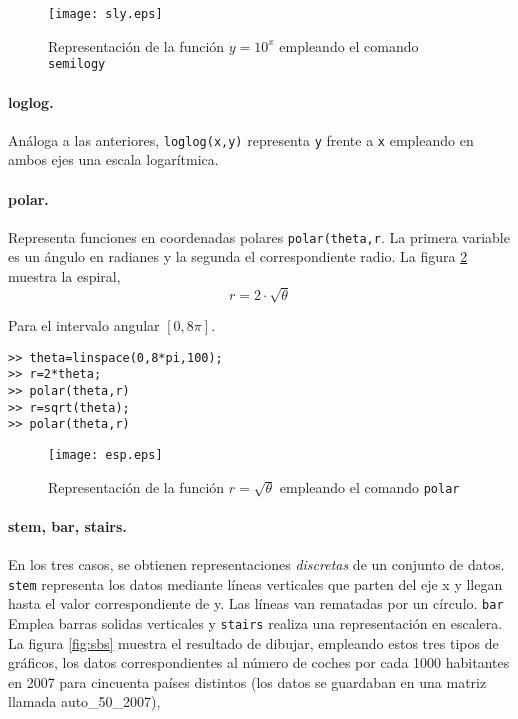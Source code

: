 \begin{figure}[h]
\centering
\texttt{[image: sly.eps]}
\caption{Representación de la función $y=10^x$ empleando el comando \texttt{semilogy}}
\label{fig:sly}
\end{figure}

\paragraph{loglog.} Análoga a las anteriores, \texttt{loglog(x,y)} representa \texttt{y} frente a \texttt{x} empleando en ambos ejes una escala logarítmica.


\paragraph{polar.} Representa funciones en coordenadas polares \texttt{polar(theta,r}. La primera variable es un ángulo en radianes y la segunda el correspondiente radio. La figura \ref{fig:esp} muestra la espiral,
\begin{equation*}
r=2\cdot\sqrt{\theta}
\end{equation*}

Para el intervalo angular $[0,8\pi]$.
 
\begin{verbatim}
>> theta=linspace(0,8*pi,100);
>> r=2*theta;
>> polar(theta,r)
>> r=sqrt(theta);
>> polar(theta,r)
\end{verbatim}

\begin{figure}[h]
\centering
\texttt{[image: esp.eps]}
\caption{Representación de la función $r=\sqrt{\theta}$ empleando el comando \texttt{polar}}
\label{fig:esp}
\end{figure}

\paragraph{stem, bar, stairs.} En los tres casos, se obtienen representaciones \emph{discretas} de un conjunto de datos. \texttt{stem} representa los datos mediante líneas verticales que parten del eje  x y llegan hasta el valor correspondiente de y. Las líneas van rematadas por un círculo. \texttt{bar} Emplea barras solidas verticales  y \texttt{stairs} realiza una representación en escalera. La figura \ref{fig:sbs} muestra el resultado de dibujar, empleando estos tres tipos de gráficos, los datos correspondientes al número de coches por cada 1000 habitantes en 2007 para cincuenta países distintos (los datos se guardaban en una matriz llamada auto\_50\_2007),

